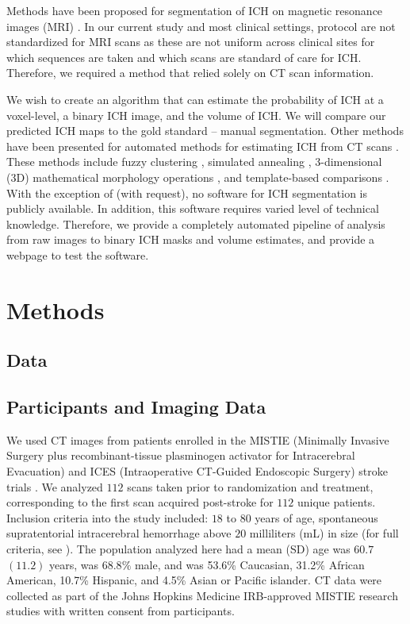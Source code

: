 \documentclass{elsarticle_nonatbib}\usepackage[]{graphicx}\usepackage[]{color}
\begin{document}
Methods have been proposed for segmentation of ICH on magnetic resonance images (MRI) \citep{wang_hematoma_2013, carhuapoma2003brain}.  In our current study and most clinical settings, protocol are not standardized for MRI scans as these are not uniform across clinical sites for which sequences are taken and which scans are standard of care for ICH.  Therefore, we required a method that relied solely on CT scan information.

We wish to create an algorithm that can estimate the probability of ICH at a voxel-level, a binary ICH image, and the volume of ICH.  We will compare our predicted ICH maps to the gold standard -- manual segmentation.  Other methods have been presented for automated methods for estimating ICH from CT scans \citep{ gillebert_automated_2014, prakash_segmentation_2012, loncaric_hierarchical_1996, loncaric_quantitative_1999, perez_set_2007}.  These methods include fuzzy clustering \citep{prakash_segmentation_2012, loncaric_hierarchical_1996}, simulated annealing \citep{loncaric_quantitative_1999}, 3-dimensional (3D) mathematical morphology operations \citep{perez_set_2007}, and template-based comparisons \citep{gillebert_automated_2014}.  With the exception of \citet{gillebert_automated_2014} (with request), no software for ICH segmentation is publicly available.  In addition, this software requires varied level of technical knowledge.  Therefore, we provide a completely automated pipeline of analysis from raw images to binary ICH masks and volume estimates, and provide a webpage to test the software. 


\section{Methods}

\subsection{Data} 
\subsection{ Participants and Imaging Data }
We used CT images from patients enrolled in the MISTIE (Minimally Invasive Surgery plus recombinant-tissue plasminogen activator for Intracerebral Evacuation) and ICES (Intraoperative CT-Guided Endoscopic Surgery) stroke trials \citep{morgan_preliminary_2008_mistie}. We analyzed $112$ scans taken prior to randomization and treatment, corresponding to the first scan acquired post-stroke for $112$ unique patients.  Inclusion criteria into the study included: $18$ to $80$ years of age, spontaneous supratentorial intracerebral hemorrhage above $20$ milliliters (mL) in size (for full criteria, see \citet{mould_minimally_2013}).  The population analyzed here had a mean (SD) age was $60.7$ $(11.2)$ years, was $68.8\%$ male, and was 53.6\% Caucasian, 31.2\% African American, 10.7\% Hispanic, and 4.5\% Asian or Pacific islander.  CT data were collected as part of the Johns Hopkins Medicine IRB-approved MISTIE research studies with written consent from participants.  
\end{document}
